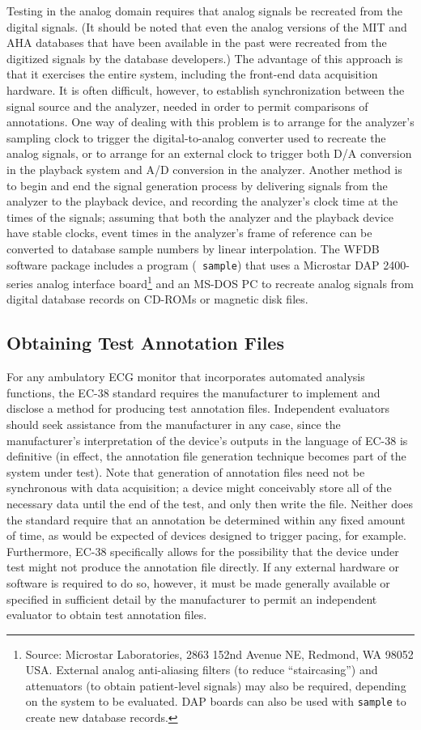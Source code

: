 Testing in the analog domain requires that analog signals be recreated from
the digital signals.  (It should be noted that even the analog versions of the
MIT and AHA databases that have been available in the past were recreated
from the digitized signals by the database developers.)  The advantage of this
approach is that it exercises the entire system, including the front-end data
acquisition hardware.  It is often difficult, however, to establish
synchronization between the signal source and the analyzer, needed in order to
permit comparisons of annotations.  One way of dealing with this problem is to
arrange for the analyzer's sampling clock to trigger the digital-to-analog
converter used to recreate the analog signals, or to arrange for an external
clock to trigger both D/A conversion in the playback system and A/D conversion
in the analyzer.  Another method is to begin and end the signal generation
process by delivering signals from the analyzer to the playback device, and
recording the analyzer's clock time at the times of the signals; assuming that
both the analyzer and the playback device have stable clocks, event times in
the analyzer's frame of reference can be converted to database sample numbers
by linear interpolation.  The WFDB software package includes a program ({\tt
sample}) that uses a Microstar DAP 2400-series analog interface
board\footnote{
Source: Microstar Laboratories, 2863 152nd Avenue NE, Redmond,
WA 98052 USA.  External analog anti-aliasing filters (to reduce
``staircasing'') and attenuators (to obtain patient-level signals) may also be
required, depending on the system to be evaluated.  DAP boards can also be
used with {\tt sample} to create new database records.}
and an MS-DOS PC to recreate analog signals from digital database records on
CD-ROMs or magnetic disk files.

\subsection{Obtaining Test Annotation Files}
For any ambulatory ECG monitor that incorporates automated analysis functions,
the EC-38 standard requires the manufacturer to implement and disclose a
method for producing test annotation files.  Independent evaluators should seek
assistance from the manufacturer in any case, since the manufacturer's
interpretation of the device's outputs in the language of EC-38 is definitive
(in effect, the annotation file generation technique becomes part of
the system under test).  Note that generation of annotation files need not be
synchronous with data acquisition; a device might conceivably store all of the
necessary data until the end of the test, and only then write the file.
Neither does the standard require that an annotation be determined within any
fixed amount of time, as would be expected of devices designed to trigger
pacing, for example.  Furthermore, EC-38 specifically allows for the
possibility that the device under test might not produce the annotation file
directly.  If any external hardware or software is required to do so, however,
it must be made generally available or specified in sufficient detail by the
manufacturer to permit an independent evaluator to obtain test annotation
files.

